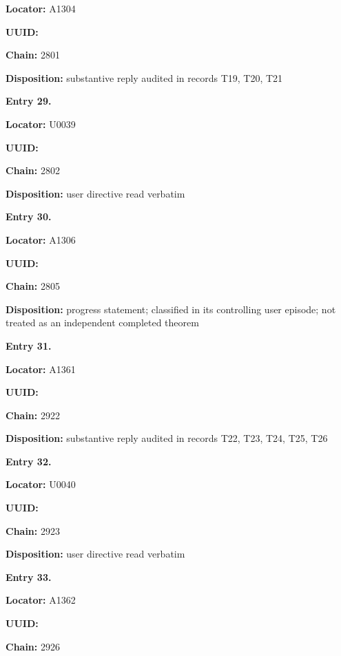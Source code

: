 \documentclass[10pt,a4paper,oneside]{report}
\begin{document}
\textbf{Locator:} A1304

\textbf{UUID:} \protect{}

\textbf{Chain:} 2801

\textbf{Disposition:} substantive reply audited in records T19, T20, T21


\textbf{Entry 29.}

\textbf{Locator:} U0039

\textbf{UUID:} \protect{}

\textbf{Chain:} 2802

\textbf{Disposition:} user directive read verbatim


\textbf{Entry 30.}

\textbf{Locator:} A1306

\textbf{UUID:} \protect{}

\textbf{Chain:} 2805

\textbf{Disposition:} progress statement; classified in its controlling
user episode; not treated as an independent completed theorem


\textbf{Entry 31.}

\textbf{Locator:} A1361

\textbf{UUID:} \protect{}

\textbf{Chain:} 2922

\textbf{Disposition:} substantive reply audited in records T22, T23,
T24, T25, T26


\textbf{Entry 32.}

\textbf{Locator:} U0040

\textbf{UUID:} \protect{}

\textbf{Chain:} 2923

\textbf{Disposition:} user directive read verbatim


\textbf{Entry 33.}

\textbf{Locator:} A1362

\textbf{UUID:} \protect{}

\textbf{Chain:} 2926
\end{document}
